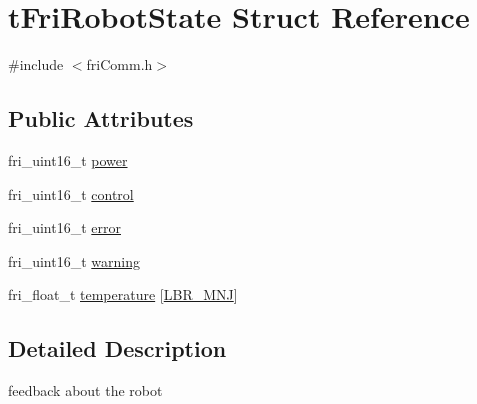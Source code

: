 \hypertarget{structtFriRobotState}{\section{t\-Fri\-Robot\-State \-Struct \-Reference}
\label{structtFriRobotState}
}


{\ttfamily \#include $<$fri\-Comm.\-h$>$}

\subsection*{\-Public \-Attributes}
\begin{DoxyCompactItemize}
\item 
fri\-\_\-uint16\-\_\-t \hyperlink{structtFriRobotState_ab8976cd187b764798006f9e65899d175}{power}
\item 
fri\-\_\-uint16\-\_\-t \hyperlink{structtFriRobotState_ac065a510edb28a2550c0c29b5d32ca96}{control}
\item 
fri\-\_\-uint16\-\_\-t \hyperlink{structtFriRobotState_ac66330e631157aacfa332273f3e65240}{error}
\item 
fri\-\_\-uint16\-\_\-t \hyperlink{structtFriRobotState_aea8124af0ebd5daeb835d6c69330169f}{warning}
\item 
fri\-\_\-float\-\_\-t \hyperlink{structtFriRobotState_af5bafdd66167ca5a93485367d23142a8}{temperature} \mbox{[}\hyperlink{friComm_8h_a14d10dff3deb8105d27539540b23ed6e}{\-L\-B\-R\-\_\-\-M\-N\-J}\mbox{]}
\end{DoxyCompactItemize}


\subsection{\-Detailed \-Description}
feedback about the robot 

